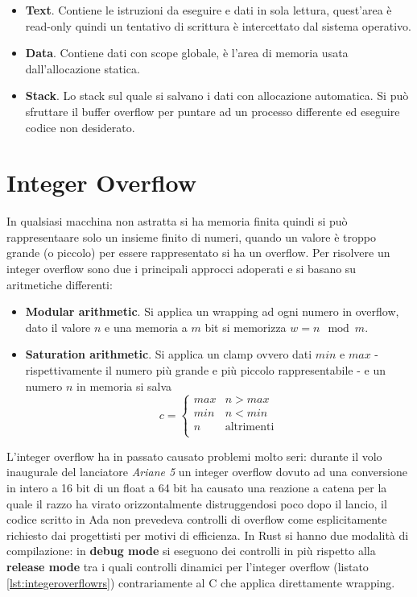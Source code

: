 \documentclass[Lau,binding=0.6cm]{sapthesis}
\begin{document}
\begin{itemize}
	\item \textbf{Text}. Contiene le istruzioni da eseguire e dati in sola lettura, quest'area è read-only quindi un tentativo di scrittura è intercettato dal sistema operativo. 
    	\item \textbf{Data}. Contiene dati con scope globale, è l'area di memoria usata dall'allocazione statica.
    	\item \textbf{Stack}. Lo stack sul quale si salvano i dati con allocazione automatica.
		Si può sfruttare il buffer overflow per puntare ad un processo differente ed eseguire codice non desiderato.
\end{itemize}

\section{Integer Overflow} \label{sec:integer_overflow}
In qualsiasi macchina non astratta si ha memoria finita quindi si può rappresentaare solo un insieme finito di numeri, quando un valore è troppo grande (o piccolo) per essere rappresentato si ha un overflow.
Per risolvere un integer overflow sono due i principali approcci adoperati e si basano su aritmetiche differenti:
\begin{itemize}
    \item \textbf{Modular arithmetic}. Si applica un wrapping ad ogni numero in overflow, dato il valore $ n $ e una memoria a $ m $ bit si memorizza $ w = n \mod m $.
    \item \textbf{Saturation arithmetic}. Si applica un clamp ovvero dati $ min $ e $ max $ - rispettivamente il numero più grande e più piccolo rappresentabile - e un numero $ n $ in memoria si salva
    \begin{equation*}
        c = \begin{cases}
            max & n > max \\
            min & n < min \\
            n  & \text{altrimenti} \\
        \end{cases}
    \end{equation*}
\end{itemize}

L'integer overflow ha in passato causato problemi molto seri: durante il volo inaugurale del lanciatore \textit{Ariane 5} un integer overflow dovuto ad una conversione in intero a 16 bit di un float a 64 bit ha causato una reazione a catena per la quale il razzo ha virato orizzontalmente distruggendosi poco dopo il lancio, il codice scritto in Ada non prevedeva controlli di overflow come esplicitamente richiesto dai progettisti per motivi di efficienza. 
In Rust si hanno due modalità di compilazione: in \textbf{debug mode} si eseguono dei controlli in più rispetto alla \textbf{release mode} tra i quali controlli dinamici per l'integer overflow (listato \ref{lst:integeroverflowrs}) contrariamente al C che applica direttamente wrapping.
\end{document}
